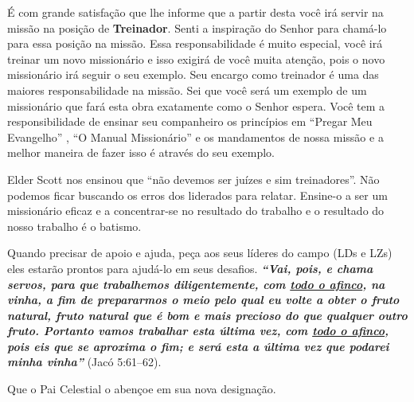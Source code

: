 	\'E com grande satisfa\c c\~ao que lhe informe que a partir desta voc\^e ir\'a servir na miss\~ao na posi\c c\~ao de \textbf{Treinador}. Senti a inspira\c c\~ao do Senhor para cham\'a-lo para essa posi\c c\~ao na miss\~ao. Essa responsabilidade \'e muito especial, voc\^e ir\'a treinar um novo mission\'ario e isso exigir\'a de voc\^e muita aten\c c\~ao, pois o novo mission\'ario ir\'a seguir o seu exemplo. Seu encargo como treinador \'e uma das maiores responsabilidade na miss\~ao. Sei que voc\^e ser\'a um exemplo de um mission\'ario que far\'a esta obra exatamente como o Senhor espera. Voc\^e tem a responsibilidade de ensinar seu companheiro os princ\'ipios em ``Pregar Meu Evangelho'' , ``O Manual Mission\'ario'' e os mandamentos de nossa miss\~ao e a melhor maneira de fazer isso \'e atrav\'es do seu exemplo.

Elder Scott nos ensinou que ``n\~ao devemos ser ju\'izes e sim treinadores''. N\~ao podemos ficar buscando os erros dos liderados para relatar. Ensine-o a ser um mission\'ario eficaz e a concentrar-se no resultado do trabalho e o resultado do nosso trabalho \'e o batismo.

Quando precisar de apoio e ajuda, pe\c ca aos seus l\'ideres do campo (LDs e LZs) eles estar\~ao prontos para ajud\'a-lo em seus desafios. \textbf{\textit{``Vai, pois, e chama servos, para que trabalhemos diligentemente, com \underline{todo o afinco}, na vinha, a fim de prepararmos o meio pelo qual eu volte a obter o fruto natural, fruto natural que \'e bom e mais precioso do que qualquer outro fruto. Portanto vamos trabalhar esta \'ultima vez, com \underline{todo o afinco}, pois eis que se aproxima o fim; e ser\'a esta a \'ultima vez que podarei minha vinha''}} (Jac\'o 5:61--62).

Que o Pai Celestial o aben\c coe em sua nova designa\c c\~ao.
